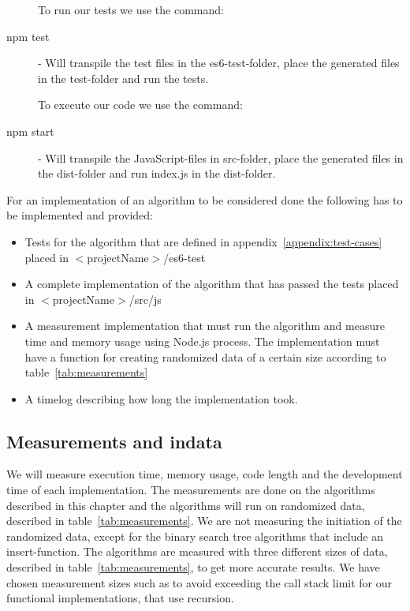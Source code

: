 \documentclass {article}
\begin{document}
\begin{description}
\item[] To run our tests we use the command:
\item[npm test] - Will transpile the test files in the es6-test-folder, place the generated files in the test-folder and run the tests.
\item[] To execute our code we use the command:
\item[npm start] - Will transpile the JavaScript-files in src-folder, place the generated files in the dist-folder and run index.js in the dist-folder.
\end{description}

For an implementation of an algorithm to be considered done the following has to be implemented and provided:
\begin{itemize}
\item Tests for the algorithm that are defined in appendix~\ref{appendix:test-cases} placed in \(<\)projectName\(>\)/es6-test
\item A complete implementation of the algorithm that has passed the tests placed in \(<\)projectName\(>\)/src/js
\item A measurement implementation that must run the algorithm and measure time and memory usage using Node.js process. The implementation must have a function for creating randomized data of a certain size according to table~\ref{tab:measurements} 
\item A timelog describing how long the implementation took. 
\end{itemize}
\subsection{Measurements and indata}
We will measure execution time, memory usage, code length and the development time of each implementation. The measurements are done on the algorithms described in this chapter and the algorithms will run on randomized data, described in table~\ref{tab:measurements}. We are not measuring the initiation of the randomized data, except for the binary search tree algorithms that include an insert-function. The algorithms are measured with three different sizes of data, described in table~\ref{tab:measurements}, to get more accurate results. We have chosen measurement sizes such as to avoid exceeding the call stack limit for our functional implementations, that use recursion.
\end{document}
